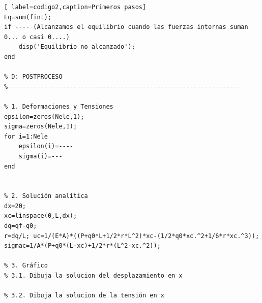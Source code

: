 \begin{lstlisting}[ label=codigo2,caption=Primeros pasos]
Eq=sum(fint);
if ---- (Alcanzamos el equilibrio cuando las fuerzas internas suman 0... o casi 0....)
	disp('Equilibrio no alcanzado');
end

% D: POSTPROCESO
%----------------------------------------------------------------

% 1. Deformaciones y Tensiones
epsilon=zeros(Nele,1);
sigma=zeros(Nele,1);
for i=1:Nele
    epsilon(i)=----
    sigma(i)=---
end


% 2. Solución analítica
dx=20;
xc=linspace(0,L,dx);
dq=qf-q0;
r=dq/L; uc=1/(E*A)*((P+q0*L+1/2*r*L^2)*xc-(1/2*q0*xc.^2+1/6*r*xc.^3)); sigmac=1/A*(P+q0*(L-xc)+1/2*r*(L^2-xc.^2));

% 3. Gráfico
% 3.1. Dibuja la solucion del desplazamiento en x

% 3.2. Dibuja la solucion de la tensión en x


\end{lstlisting}